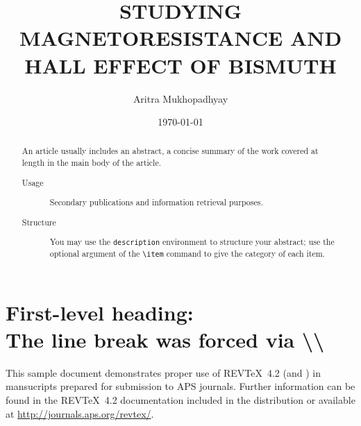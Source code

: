 \documentclass[%
 reprint,
 amsmath,amssymb,
 aps,
]{revtex4-2}
\begin{document}
\title{STUDYING MAGNETORESISTANCE AND HALL EFFECT OF BISMUTH}

    \author{Aritra Mukhopadhyay}



  \date{\today}%

  \begin{abstract}
    An article usually includes an abstract, a concise summary of the work
    covered at length in the main body of the article. 
    \begin{description}
      \item[Usage]
      Secondary publications and information retrieval purposes.
      \item[Structure]
      You may use the \texttt{description} environment to structure your abstract;
      use the optional argument of the \verb+\item+ command to give the category of each item. 
    \end{description}
  \end{abstract}

  \maketitle


  \section{\label{sec:level1}First-level heading:\protect\\ The line
  break was forced \lowercase{via} \textbackslash\textbackslash}

  This sample document demonstrates proper use of REV\TeX~4.2 (and
  \LaTeXe) in mansucripts prepared for submission to APS
  journals. Further information can be found in the REV\TeX~4.2
  documentation included in the distribution or available at
  \url{http://journals.aps.org/revtex/}.
\end{document}
